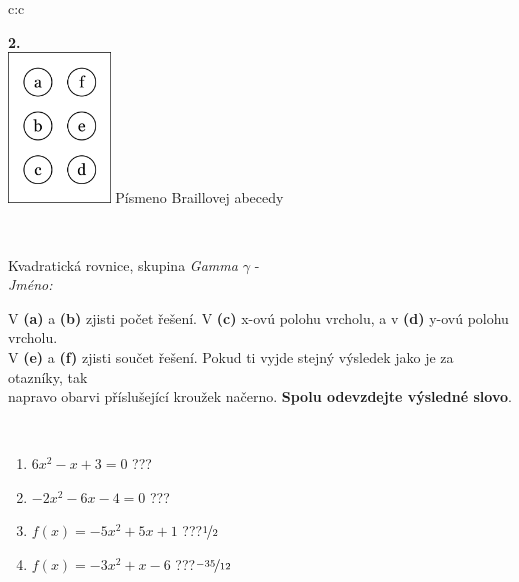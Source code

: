 \documentclass[10pt]{report}
\begin{document}
\begin{tabular}{c:c}
\begin{minipage}[c][104.5mm][t]{0.5\linewidth}
\begin{center}
\begin{minipage}{0.20\linewidth}
\begin{center}
{\Huge\bfseries 2.} \\[2mm]
\includegraphics[height=40mm]{../images/braille.png}
{\small Písmeno Braillovej abecedy}
\end{center}
\end{minipage}
\end{center}
\end{minipage}
\\ \hdashline
\begin{minipage}[c][104.5mm][t]{0.5\linewidth}
\begin{center}
\vspace{7mm}
{\huge Kvadratická rovnice, skupina \textit{Gamma $\gamma$} -}\\[5mm]
\textit{Jméno:}\phantom{xxxxxxxxxxxxxxxxxxxxxxxxxxxxxxxxxxxxxxxxxxxxxxxxxxxxxxxxxxxxxxxxx}\\[5mm]
\begin{minipage}{0.95\linewidth}
\begin{center}
V \textbf{(a)} a \textbf{(b)} zjisti počet řešení. V \textbf{(c)} x-ovú polohu vrcholu, a v \textbf{(d)} y-ovú polohu vrcholu.\\V \textbf{(e)} a \textbf{(f)} zjisti součet řešení. Pokud ti vyjde stejný výsledek jako je za otazníky, tak\\napravo obarvi příslušející kroužek načerno. \textbf{Spolu odevzdejte výsledné slovo}.
\end{center}
\end{minipage}
\\[1mm]
\begin{minipage}{0.79\linewidth}
\begin{center}
\begin{varwidth}{\linewidth}
\begin{enumerate}
\Large
\item $6x^2-x+3=0$\quad \dotfill\; ???\;\dotfill {}
\item $-2x^2-6x-4=0$\quad \dotfill\; ???\;\dotfill {}
\item $f(x)=-5x^2+5x+1$\quad \dotfill\; ???\;\dotfill \quad $\nicefrac{1}{2}$
\item $f(x)=-3x^2+x-6$\quad \dotfill\; ???\;\dotfill \quad $\nicefrac{-35}{12}$

\end{enumerate}
\end{varwidth}
\end{center}
\end{minipage}
\end{center}
\end{minipage}
\end{tabular}
\end{document}
